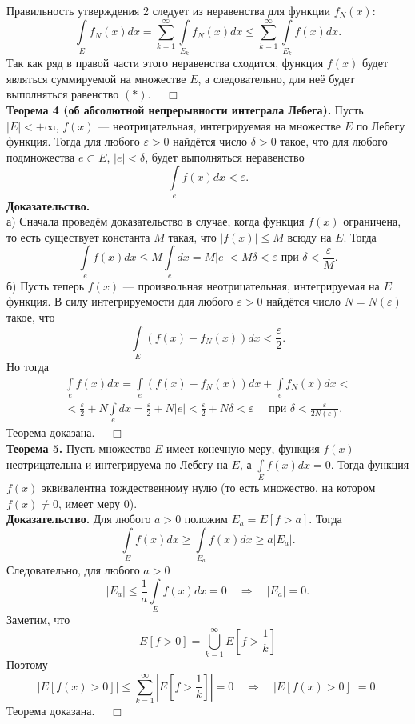 \documentclass[12pt,a4paper, titlepage]{article}
\begin{document}
Правильность утверждения 2 следует из неравенства для функции $f_N(x)$:
$$
\int\limits_E f_N(x) dx = \sum_{k=1}^\infty \int\limits_{E_k} f_N(x) dx \leqslant \sum_{k=1}^\infty \int\limits_{E_k} f(x) dx.
$$
Так как ряд в правой части этого неравенства сходится, функция $f(x)$ будет являться суммируемой на множестве $E$, а следовательно, для неё будет выполняться равенство $(*)$. $\quad \Box$\\

\textbf{Теорема 4 (об абсолютной непрерывности интеграла Лебега).} Пусть $|E| < + \infty$, $f(x)$ --- неотрицательная, интегрируемая на множестве $E$ по Лебегу функция. Тогда для любого $\varepsilon > 0$ найдётся число $\delta > 0$ такое, что для любого подмножества $e \subset E$, $|e| < \delta$, будет выполняться неравенство
$$
\int\limits_e f(x) dx < \varepsilon.
$$
\textbf{Доказательство.}\\
а) Сначала проведём доказательство в случае, когда функция $f(x)$ ограничена, то есть существует константа $M$ такая, что $|f(x)| \leqslant M$ всюду на $E$. Тогда
$$
\int\limits_e f(x) dx \leqslant M \int\limits_e dx = M |e| < M \delta < \varepsilon \mbox{ при } \delta < \frac \varepsilon M.
$$
б) Пусть теперь $f(x)$ --- произвольная неотрицательная, интегрируемая на $E$ функция. В силу интегрируемости для любого $\varepsilon > 0$ найдётся число $N = N(\varepsilon)$ такое, что
$$
\int\limits_E (f(x) - f_N(x)) dx < \frac \varepsilon 2.
$$
Но тогда
\begin{multline*}
\int\limits_e f(x) dx = \int\limits_e (f(x) - f_N(x)) dx + \int\limits_e f_N(x) dx < \\
< \frac \varepsilon 2 + N \int\limits_e dx = \frac \varepsilon 2 + N |e| < \frac \varepsilon 2 + N \delta < \varepsilon \quad \mbox{ при } \delta < \frac \varepsilon {2 N(\varepsilon)}.
\end{multline*}
Теорема доказана. $\quad \Box$\\

\textbf{Теорема 5.} Пусть множество $E$ имеет конечную меру, функция $f(x)$ неотрицательна и интегрируема по Лебегу на $E$, а $\int\limits_E f(x) dx = 0$. Тогда функция $f(x)$ эквивалентна тождественному нулю (то есть множество, на котором $f(x) \neq 0$, имеет меру 0).\\
\textbf{Доказательство.} Для любого $a > 0$ положим $E_a = E[f > a]$. Тогда
$$
\int\limits_E f(x) dx \geqslant \int\limits_{E_a} f(x) dx \geqslant a |E_a|.
$$
Следовательно, для любого $a > 0$
$$
|E_a| \leqslant \frac 1 a \int\limits_E f(x) dx = 0 \quad \Rightarrow \quad |E_a| = 0.
$$
Заметим, что
$$
E[f > 0] = \bigcup_{k=1}^\infty E \left[f > \frac 1 k \right]
$$
Поэтому
$$
|E[f(x) > 0]| \leqslant \sum_{k=1}^\infty \left| E \left[f > \frac 1 k \right]\right| = 0 \quad \Rightarrow \quad |E[f(x) > 0]| = 0.
$$
Теорема доказана. $\quad \Box$\\
\end{document}
